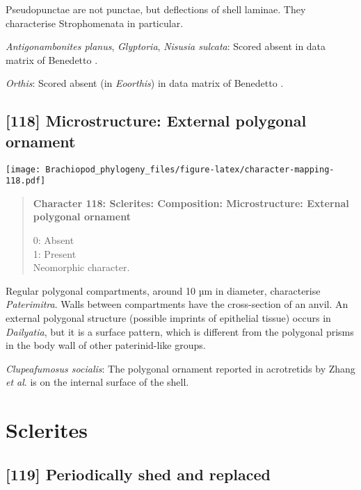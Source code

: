 \documentclass[openany]{book}
\theoremstyle{definition}
\theoremstyle{definition}
\theoremstyle{definition}
\theoremstyle{remark}
\begin{document}
Pseudopunctae are not punctae, but deflections of shell laminae. They
characterise Strophomenata in particular.

\hypertarget{Antigonambonites_planus-coding-117}{}
\emph{Antigonambonites planus}, \emph{Glyptoria}, \emph{Nisusia
sulcata}: Scored absent in data matrix of Benedetto
\citeyearpar{Benedetto2009iChaniella}.

\hypertarget{Orthis-coding-117}{}
\emph{Orthis}: Scored absent (in \emph{Eoorthis}) in data matrix of
Benedetto \citeyearpar{Benedetto2009iChaniella}.

\subsection*{{[}118{]} Microstructure: External polygonal
ornament}\label{microstructure-external-polygonal-ornament}

\texttt{[image: Brachiopod\_phylogeny\_files/figure-latex/character-mapping-118.pdf]}

\begin{quote}
\textbf{Character 118: Sclerites: Composition: Microstructure: External
polygonal ornament}

0: Absent\\
1: Present\\
Neomorphic character.
\end{quote}

Regular polygonal compartments, around 10 µm in diameter, characterise
\emph{Paterimitra}. Walls between compartments have the cross-section of
an anvil. An external polygonal structure (possible imprints of
epithelial tissue) occurs in \emph{Dailyatia}, but it is a surface
pattern, which is different from the polygonal prisms in the body wall
of other paterinid-like groups.

\hypertarget{Clupeafumosus_socialis-coding-118}{}
\emph{Clupeafumosus socialis}: The polygonal ornament reported in
acrotretids by Zhang \emph{et al}. \citeyearpar{Zhang2016Epithelialcell}
is on the internal surface of the shell.

\section{Sclerites}\label{sclerites-1}

\subsection*{{[}119{]} Periodically shed and
replaced}\label{periodically-shed-and-replaced}
\end{document}
